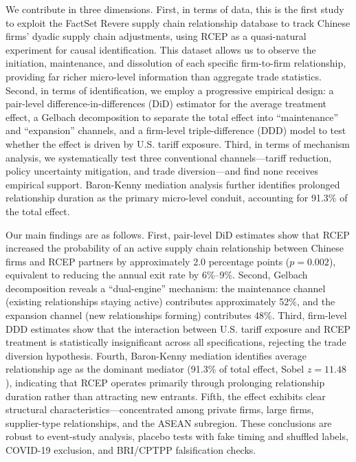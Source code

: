 \documentclass[preprint,12pt,authoryear]{elsarticle}
\begin{document}
We contribute in three dimensions. First, in terms of data, this is the first study to exploit the FactSet Revere supply chain relationship database to track Chinese firms' dyadic supply chain adjustments, using RCEP as a quasi-natural experiment for causal identification. This dataset allows us to observe the initiation, maintenance, and dissolution of each specific firm-to-firm relationship, providing far richer micro-level information than aggregate trade statistics. Second, in terms of identification, we employ a progressive empirical design: a pair-level difference-in-differences (DiD) estimator for the average treatment effect, a Gelbach decomposition to separate the total effect into ``maintenance'' and ``expansion'' channels, and a firm-level triple-difference (DDD) model to test whether the effect is driven by U.S. tariff exposure. Third, in terms of mechanism analysis, we systematically test three conventional channels—tariff reduction, policy uncertainty mitigation, and trade diversion—and find none receives empirical support. Baron-Kenny mediation analysis further identifies prolonged relationship duration as the primary micro-level conduit, accounting for 91.3\% of the total effect.

Our main findings are as follows. First, pair-level DiD estimates show that RCEP increased the probability of an active supply chain relationship between Chinese firms and RCEP partners by approximately 2.0 percentage points ($p=0.002$), equivalent to reducing the annual exit rate by 6\%--9\%. Second, Gelbach decomposition reveals a ``dual-engine'' mechanism: the maintenance channel (existing relationships staying active) contributes approximately 52\%, and the expansion channel (new relationships forming) contributes 48\%. Third, firm-level DDD estimates show that the interaction between U.S. tariff exposure and RCEP treatment is statistically insignificant across all specifications, rejecting the trade diversion hypothesis. Fourth, Baron-Kenny mediation identifies average relationship age as the dominant mediator (91.3\% of total effect, Sobel $z=11.48$), indicating that RCEP operates primarily through prolonging relationship duration rather than attracting new entrants. Fifth, the effect exhibits clear structural characteristics—concentrated among private firms, large firms, supplier-type relationships, and the ASEAN subregion. These conclusions are robust to event-study analysis, placebo tests with fake timing and shuffled labels, COVID-19 exclusion, and BRI/CPTPP falsification checks.
\end{document}
